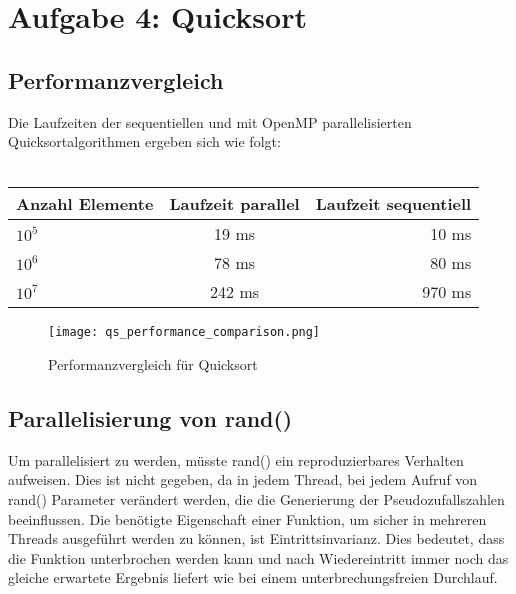 \chapter{Aufgabe 4: Quicksort}
\section{Performanzvergleich}
Die Laufzeiten der sequentiellen und mit OpenMP parallelisierten Quicksortalgorithmen ergeben sich wie folgt:\\ \\

\begin{tabular}{l|c|r}
Anzahl Elemente & Laufzeit parallel & Laufzeit sequentiell \\
\hline
$10^5$ & 19 ms & 10 ms \\
$10^6$ & 78 ms & 80 ms \\
$10^7$ & 242 ms & 970 ms \\
\end{tabular}

\begin{figure}[H]
    \centering
    \texttt{[image: qs\_performance\_comparison.png]}
    \caption{Performanzvergleich für Quicksort}
    \label{qs_perf_comp}
\end{figure}

\section{Parallelisierung von rand()}
Um parallelisiert zu werden, müsste rand() ein reproduzierbares Verhalten aufweisen. Dies ist nicht gegeben, da in jedem Thread, bei jedem Aufruf von rand() Parameter verändert werden, die die Generierung der Pseudozufallszahlen beeinflussen. Die benötigte Eigenschaft einer Funktion, um sicher in mehreren Threads ausgeführt werden zu können, ist Eintrittsinvarianz. Dies bedeutet, dass die Funktion unterbrochen werden kann und nach Wiedereintritt immer noch das gleiche erwartete Ergebnis liefert wie bei einem unterbrechungsfreien Durchlauf.
